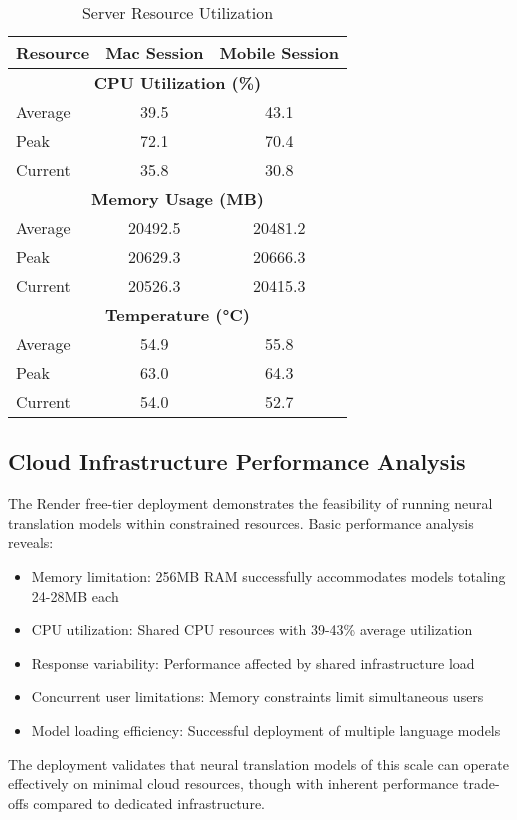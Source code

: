\documentclass[conference]{IEEEtran}
\begin{document}
\begin{table}[htbp]
\centering
\caption{Server Resource Utilization}
\label{tab:server-resources}
\begin{tabular}{@{}lcc@{}}
\toprule
Resource & Mac Session & Mobile Session \\
\midrule
\multicolumn{3}{c}{\textbf{CPU Utilization (\%)}} \\
Average & 39.5 & 43.1 \\
Peak & 72.1 & 70.4 \\
Current & 35.8 & 30.8 \\
\midrule
\multicolumn{3}{c}{\textbf{Memory Usage (MB)}} \\
Average & 20492.5 & 20481.2 \\
Peak & 20629.3 & 20666.3 \\
Current & 20526.3 & 20415.3 \\
\midrule
\multicolumn{3}{c}{\textbf{Temperature (°C)}} \\
Average & 54.9 & 55.8 \\
Peak & 63.0 & 64.3 \\
Current & 54.0 & 52.7 \\
\bottomrule
\end{tabular}
\end{table}

\subsection{Cloud Infrastructure Performance Analysis}

The Render free-tier deployment demonstrates the feasibility of running neural translation models within constrained resources. Basic performance analysis reveals:

\begin{itemize}
    \item Memory limitation: 256MB RAM successfully accommodates models totaling 24-28MB each
    \item CPU utilization: Shared CPU resources with 39-43\% average utilization
    \item Response variability: Performance affected by shared infrastructure load
    \item Concurrent user limitations: Memory constraints limit simultaneous users
    \item Model loading efficiency: Successful deployment of multiple language models
\end{itemize}

The deployment validates that neural translation models of this scale can operate effectively on minimal cloud resources, though with inherent performance trade-offs compared to dedicated infrastructure.
\end{document}
